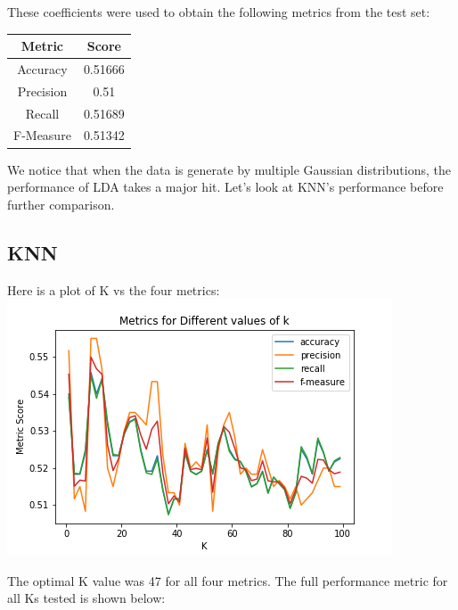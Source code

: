 \documentclass{article}
\begin{document}
These coefficients were used to obtain the following metrics from the test set:
\begin{center}
\begin{tabular}{ |c|c| }
	\hline
	\textbf{Metric} & \textbf{Score} \\
	\hline
	Accuracy & 0.51666 \\
	Precision & 0.51 \\
	Recall & 0.51689 \\
    F-Measure & 0.51342 \\
	\hline
\end{tabular}
\end{center}

We notice that when the data is generate by multiple Gaussian distributions, the performance of LDA takes a major hit. Let's look at KNN's performance before further comparison.

\subsection{KNN}
Here is a plot of K vs the four metrics: \\
\includegraphics[width=\linewidth]{knn_q5.png}

The optimal K value was 47 for all four metrics. The full performance metric for all Ks tested is shown below:
\end{document}
